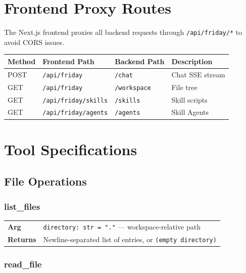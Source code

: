 \documentclass[11pt,a4paper]{article}
\begin{document}
\section{Frontend Proxy Routes}

The Next.js frontend proxies all backend requests through \texttt{/api/friday/*} to avoid CORS issues.

\begin{table}[h!]
\centering
\begin{tabular}{@{}llll@{}}
\toprule
\textbf{Method} & \textbf{Frontend Path} & \textbf{Backend Path} & \textbf{Description} \\
\midrule
POST & \texttt{/api/friday} & \texttt{/chat} & Chat SSE stream \\
GET & \texttt{/api/friday} & \texttt{/workspace} & File tree \\
GET & \texttt{/api/friday/skills} & \texttt{/skills} & Skill scripts \\
GET & \texttt{/api/friday/agents} & \texttt{/agents} & Skill Agents \\
\bottomrule
\end{tabular}
\end{table}

\section{Tool Specifications}

\subsection{File Operations}

\subsubsection{list\_files}

\begin{tabular}{@{}lp{10cm}@{}}
\textbf{Arg} & \texttt{directory: str = "."} --- workspace-relative path \\
\textbf{Returns} & Newline-separated list of entries, or \texttt{(empty directory)} \\
\end{tabular}

\subsubsection{read\_file}
\end{document}
